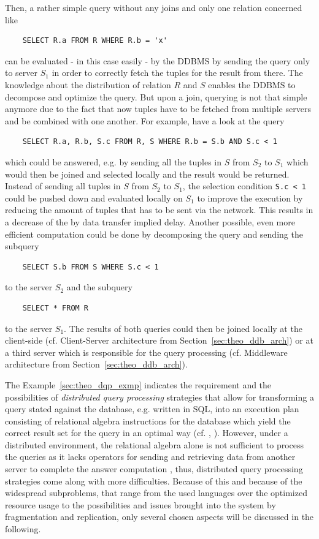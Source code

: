 \begin{exmp}
Then, a rather simple query without any joins and only one relation concerned like
\begin{verbatim}
    SELECT R.a FROM R WHERE R.b = 'x'
\end{verbatim}
can be evaluated - in this case easily - by the DDBMS by sending the query only to server $S_1$ in order to correctly fetch the tuples for the result from
there. The knowledge about the distribution of relation $R$ and $S$ enables the DDBMS to decompose and optimize the query. But upon a join, querying is not
that simple anymore due to the fact that now tuples have to be fetched from multiple servers and be combined with one another. 
For example, have a look at the query
\begin{verbatim}
    SELECT R.a, R.b, S.c FROM R, S WHERE R.b = S.b AND S.c < 1
\end{verbatim}
which could be answered, e.g. by sending all the tuples in $S$ from $S_2$ to $S_1$ which would then be joined and selected locally and the result would be
returned. Instead of sending all tuples in $S$ from $S_2$ to $S_1$, the selection condition \verb!S.c < 1! could be pushed down and evaluated locally on 
$S_1$ to improve the execution by reducing the amount of tuples that has to be sent via the network. This results in a decrease of the by data transfer
implied delay. Another possible, even more efficient computation could be done by decomposing the query and sending the subquery
\begin{verbatim}
    SELECT S.b FROM S WHERE S.c < 1
\end{verbatim}
to the server $S_2$ and the subquery
\begin{verbatim}
    SELECT * FROM R
\end{verbatim}
to the server $S_1$. The results of both queries could then be joined locally at the client-side 
(cf. Client-Server architecture from Section~\ref{sec:theo_ddb_arch}) or at a third server which is responsible for the query processing 
(cf. Middleware architecture from Section~\ref{sec:theo_ddb_arch}).

\end{exmp}

The Example~\ref{sec:theo_dqp_exmp} indicates the requirement and the possibilities of \emph{distributed query processing} strategies that allow for
transforming a query stated against the database, e.g. written in SQL, into an execution plan consisting of relational algebra instructions for the
database which yield the correct result set for the query in an optimal way (cf. \cite[p.~174]{Ozsu1991}, \citep{Sattler2009DistQuer}). However, under a 
distributed environment, the relational algebra alone is not sufficient to process the queries as it lacks operators for sending and retrieving data from
another server to complete the answer computation \cite[p.~175]{Ozsu1991}, thus, distributed query processing strategies come along with more difficulties.
Because of this and because of the widespread subproblems, that range from the used languages over the optimized resource usage to the possibilities and 
issues brought into the system by fragmentation and replication, only several chosen aspects will be discussed in the following.


